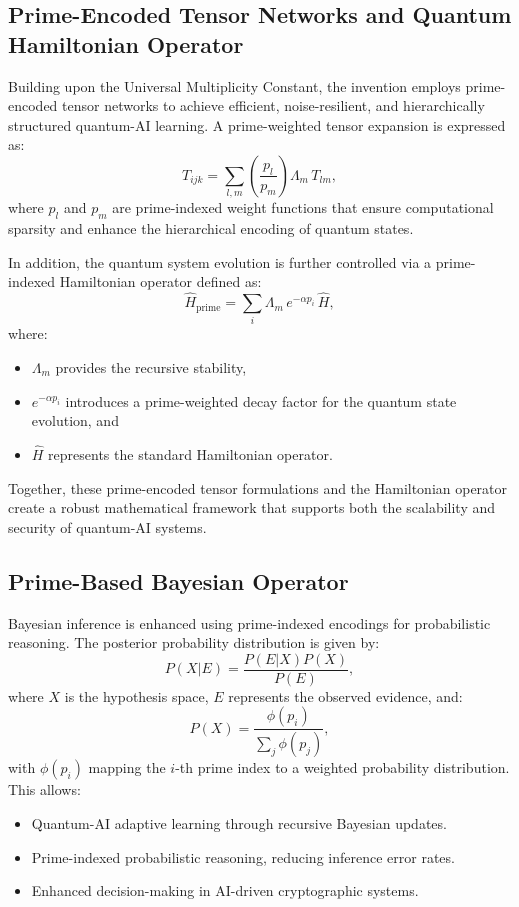 \documentclass{article}
\theoremstyle{plain}
\begin{document}
\subsection{Prime-Encoded Tensor Networks and Quantum Hamiltonian Operator}
Building upon the Universal Multiplicity Constant, the invention employs prime-encoded tensor networks to achieve efficient, noise-resilient, and hierarchically structured quantum-AI learning. A prime-weighted tensor expansion is expressed as:
\begin{equation}
T_{ijk} = \sum_{l,m} \left( \frac{p_l}{p_m} \right) \Lambda_m \, T_{lm},
\end{equation}
where \(p_l\) and \(p_m\) are prime-indexed weight functions that ensure computational sparsity and enhance the hierarchical encoding of quantum states.

In addition, the quantum system evolution is further controlled via a prime-indexed Hamiltonian operator defined as:
\begin{equation}
\hat{H}_{\text{prime}} = \sum_{i} \Lambda_m \, e^{-\alpha p_i} \, \hat{H},
\end{equation}
where:
\begin{itemize}
    \item \(\Lambda_m\) provides the recursive stability,
    \item \(e^{-\alpha p_i}\) introduces a prime-weighted decay factor for the quantum state evolution, and
    \item \(\hat{H}\) represents the standard Hamiltonian operator.
\end{itemize}

Together, these prime-encoded tensor formulations and the Hamiltonian operator create a robust mathematical framework that supports both the scalability and security of quantum-AI systems.

\subsection{Prime-Based Bayesian Operator}

Bayesian inference is enhanced using prime-indexed encodings for probabilistic reasoning. The posterior probability distribution is given by:
\begin{equation}
P(X | E) = \frac{P(E | X) P(X)}{P(E)},
\end{equation}
where $X$ is the hypothesis space, $E$ represents the observed evidence, and:
\begin{equation}
P(X) = \frac{\phi(p_i)}{\sum_{j} \phi(p_j)},
\end{equation}
with $\phi(p_i)$ mapping the $i$-th prime index to a weighted probability distribution. This allows:
\begin{itemize}
    \item Quantum-AI adaptive learning through recursive Bayesian updates.
    \item Prime-indexed probabilistic reasoning, reducing inference error rates.
    \item Enhanced decision-making in AI-driven cryptographic systems.
\end{itemize}
\end{document}
